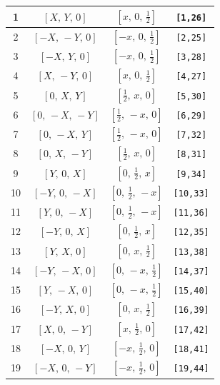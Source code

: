 \documentclass[fleqn,8pt]{jsarticle}
\begin{document}
\begin{longtable}{cccc}
1 & $\left[ X,\, Y,\, 0 \right]$ & $\left[ x,\, 0,\, \frac{1}{2} \right]$ & {\tt [1,26]} \\ \hline
2 & $\left[ - X,\, - Y,\, 0 \right]$ & $\left[ - x,\, 0,\, \frac{1}{2} \right]$ & {\tt [2,25]} \\ \hline
3 & $\left[ - X,\, Y,\, 0 \right]$ & $\left[ - x,\, 0,\, \frac{1}{2} \right]$ & {\tt [3,28]} \\ \hline
4 & $\left[ X,\, - Y,\, 0 \right]$ & $\left[ x,\, 0,\, \frac{1}{2} \right]$ & {\tt [4,27]} \\ \hline
5 & $\left[ 0,\, X,\, Y \right]$ & $\left[ \frac{1}{2},\, x,\, 0 \right]$ & {\tt [5,30]} \\ \hline
6 & $\left[ 0,\, - X,\, - Y \right]$ & $\left[ \frac{1}{2},\, - x,\, 0 \right]$ & {\tt [6,29]} \\ \hline
7 & $\left[ 0,\, - X,\, Y \right]$ & $\left[ \frac{1}{2},\, - x,\, 0 \right]$ & {\tt [7,32]} \\ \hline
8 & $\left[ 0,\, X,\, - Y \right]$ & $\left[ \frac{1}{2},\, x,\, 0 \right]$ & {\tt [8,31]} \\ \hline
9 & $\left[ Y,\, 0,\, X \right]$ & $\left[ 0,\, \frac{1}{2},\, x \right]$ & {\tt [9,34]} \\ \hline
10 & $\left[ - Y,\, 0,\, - X \right]$ & $\left[ 0,\, \frac{1}{2},\, - x \right]$ & {\tt [10,33]} \\ \hline
11 & $\left[ Y,\, 0,\, - X \right]$ & $\left[ 0,\, \frac{1}{2},\, - x \right]$ & {\tt [11,36]} \\ \hline
12 & $\left[ - Y,\, 0,\, X \right]$ & $\left[ 0,\, \frac{1}{2},\, x \right]$ & {\tt [12,35]} \\ \hline
13 & $\left[ Y,\, X,\, 0 \right]$ & $\left[ 0,\, x,\, \frac{1}{2} \right]$ & {\tt [13,38]} \\ \hline
14 & $\left[ - Y,\, - X,\, 0 \right]$ & $\left[ 0,\, - x,\, \frac{1}{2} \right]$ & {\tt [14,37]} \\ \hline
15 & $\left[ Y,\, - X,\, 0 \right]$ & $\left[ 0,\, - x,\, \frac{1}{2} \right]$ & {\tt [15,40]} \\ \hline
16 & $\left[ - Y,\, X,\, 0 \right]$ & $\left[ 0,\, x,\, \frac{1}{2} \right]$ & {\tt [16,39]} \\ \hline
17 & $\left[ X,\, 0,\, - Y \right]$ & $\left[ x,\, \frac{1}{2},\, 0 \right]$ & {\tt [17,42]} \\ \hline
18 & $\left[ - X,\, 0,\, Y \right]$ & $\left[ - x,\, \frac{1}{2},\, 0 \right]$ & {\tt [18,41]} \\ \hline
19 & $\left[ - X,\, 0,\, - Y \right]$ & $\left[ - x,\, \frac{1}{2},\, 0 \right]$ & {\tt [19,44]} \\ \hline

\end{longtable}
\end{document}
